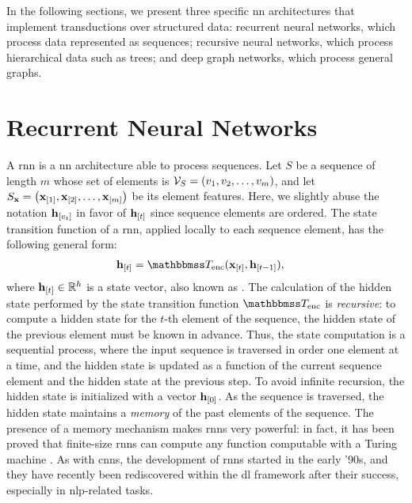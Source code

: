 In the following sections, we present three specific \gls{nn} architectures that implement transductions over structured data: recurrent neural networks, which process data represented as sequences; recursive neural networks, which process hierarchical data such as trees; and deep graph networks, which process general graphs.

\section{Recurrent Neural Networks}\label{sec:rnns}
A \gls{rnn} is a \gls{nn} architecture able to process sequences. Let $S$ be a sequence of length $m$ whose set of elements is $\Cal{V}_S = (v_1, v_2, \ldots, v_m)$, and let $S_{\Vector{x}} = \Seq{\Elem{x}{1}, \Elem{x}{2}, \ldots, \Elem{x}{m}}$ be its element features. Here, we slightly abuse the notation $\Elem{h}{v_t}$ in favor of $\Elem{h}{t}$ since sequence elements are ordered. The state transition function of a \gls{rnn}, applied locally to each sequence element, has the following general form:
\begin{align*}
    \Elem{h}{t} &= \Transduction_{\Fun{enc}}(\Elem{x}{t}, \Elem{h}{t-1}),
\end{align*}
where $\Elem{h}{t} \in \Real^h$ is a state vector, also known as . The calculation of the hidden state performed by the state transition function $\Transduction_{\Fun{enc}}$ is \emph{recursive}: to compute a hidden state for the $t$-th element of the sequence, the hidden state of the previous element must be known in advance. Thus, the state computation is a sequential process, where the input sequence is traversed in order one element at a time, and the hidden state is updated as a function of the current sequence element and the hidden state at the previous step. To avoid infinite recursion, the hidden state is initialized with a vector $\Elem{h}{0}$. As the sequence is traversed, the hidden state maintains a \emph{memory} of the past elements of the sequence. The presence of a memory mechanism makes \glspl{rnn} very powerful: in fact, it has been proved that finite-size \glspl{rnn} can compute any function computable with a Turing machine \citep{siegelmann1995rnnturing}. As with \glspl{cnn}, the development of \glspl{rnn} started in the early '90s, and they have recently been rediscovered within the \gls{dl} framework after their success, especially in \gls{nlp}-related tasks.

